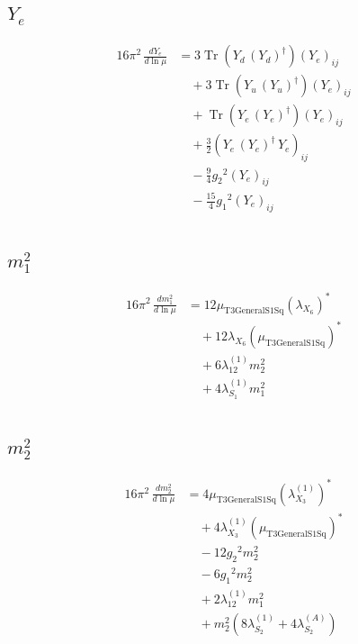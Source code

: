 \documentclass[10pt,a4paper]{article}
\begin{document}
\subsection*{$Y_e$}
\begin{align*}
16\pi^2\,\frac{d Y_e}{d\ln\mu} &=3 \operatorname{Tr}\!\left({Y_d}\,\left({Y_d}\right)^{\dagger}\right) \left({Y_e}\right)_{ij} \\
&\quad +3 \operatorname{Tr}\!\left({Y_u}\,\left({Y_u}\right)^{\dagger}\right) \left({Y_e}\right)_{ij} \\
&\quad +\operatorname{Tr}\!\left({Y_e}\,\left({Y_e}\right)^{\dagger}\right) \left({Y_e}\right)_{ij} \\
&\quad +\frac{3}{2} \left({Y_e}\,\left({Y_e}\right)^{\dagger}\,{Y_e}\right)_{ij} \\
&\quad -\frac{9}{4} {g_2}^2 \left({Y_e}\right)_{ij} \\
&\quad -\frac{15}{4} {g_1}^2 \left({Y_e}\right)_{ij} \\
\end{align*}
\subsection*{$m_1^2$}
\begin{align*}
16\pi^2\,\frac{d m_1^2}{d\ln\mu} &=12 {\mu_{\mathrm{T3GeneralS1Sq}}} \left({\lambda_{X_{6}}}\right)^{*} \\
&\quad +12 {\lambda_{X_{6}}} \left({\mu_{\mathrm{T3GeneralS1Sq}}}\right)^{*} \\
&\quad +6 {\lambda_{12}^{(1)}} {m_2^2} \\
&\quad +4 {\lambda_{S_1}^{(1)}} {m_1^2} \\
\end{align*}
\subsection*{$m_2^2$}
\begin{align*}
16\pi^2\,\frac{d m_2^2}{d\ln\mu} &=4 {\mu_{\mathrm{T3GeneralS1Sq}}} \left({\lambda_{X_{3}}^{(1)}}\right)^{*} \\
&\quad +4 {\lambda_{X_{3}}^{(1)}} \left({\mu_{\mathrm{T3GeneralS1Sq}}}\right)^{*} \\
&\quad -12 {g_2}^2 {m_2^2} \\
&\quad -6 {g_1}^2 {m_2^2} \\
&\quad +2 {\lambda_{12}^{(1)}} {m_1^2} \\
&\quad +{m_2^2} (8 {\lambda_{S_2}^{(1)}}+4 {\lambda_{S_2}^{(A)}}) \\
\end{align*}
\end{document}
